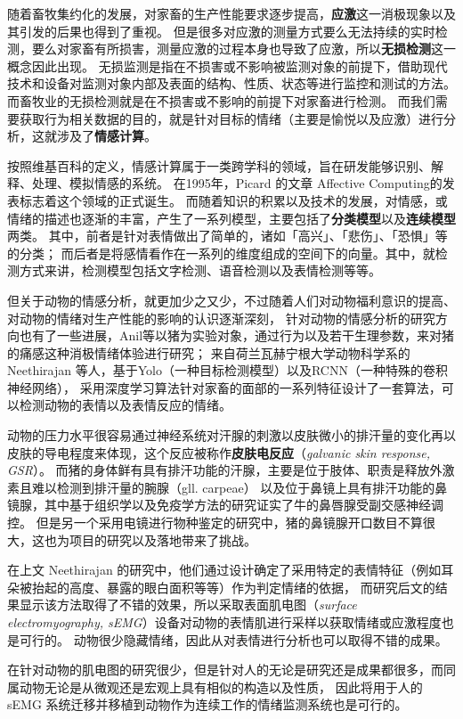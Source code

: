 \documentclass[UTF8]{ctexart}
\begin{document}
随着畜牧集约化的发展，对家畜的生产性能要求逐步提高，\textbf{应激}这一消极现象以及其引发的后果也得到了重视。
但是很多对应激的测量方式要么无法持续的实时检测，要么对家畜有所损害，测量应激的过程本身也导致了应激，所以\textbf{无损检测}这一概念因此出现。
无损监测是指在不损害或不影响被监测对象的前提下，借助现代技术和设备对监测对象内部及表面的结构、性质、状态等进行监控和测试的方法。
而畜牧业的无损检测就是在不损害或不影响的前提下对家畜进行检测。\cite{wang2017monitor}
而我们需要获取行为相关数据的目的，就是针对目标的情绪（主要是愉悦以及应激）进行分析，这就涉及了\textbf{情感计算}。
\par
按照维基百科的定义，情感计算属于一类跨学科的领域，旨在研发能够识别、解释、处理、模拟情感的系统。
在1995年，Picard 的文章 Affective Computing\cite{picard1995ac}的发表标志着这个领域的正式诞生。
而随着知识的积累以及技术的发展，对情感，或情绪的描述也逐渐的丰富，产生了一系列模型，主要包括了\textbf{分类模型}以及\textbf{连续模型}两类。
其中，前者是针对表情做出了简单的，诸如「高兴」、「悲伤」、「恐惧」等的分类；
而后者是将感情看作在一系列的维度组成的空间下的向量。其中，就检测方式来讲，检测模型包括文字检测、语音检测以及表情检测等等。
\par
但关于动物的情感分析，就更加少之又少，不过随着人们对动物福利意识的提高、对动物的情绪对生产性能的影响的认识逐渐深刻\cite{wang2017monitor}，
针对动物的情感分析的研究方向也有了一些进展，Anil等\cite{anil2006pain}以猪为实验对象，通过行为以及若干生理参数，来对猪的痛感这种消极情绪体验进行研究；
来自荷兰瓦赫宁根大学动物科学系的 Neethirajan 等人\cite{neethirajan2021happy}，基于Yolo（一种目标检测模型）以及RCNN（一种特殊的卷积神经网络），
采用深度学习算法针对家畜的面部的一系列特征设计了一套算法，可以检测动物的表情以及表情反应的情绪。
\par
动物的压力水平很容易通过神经系统对汗腺的刺激以皮肤微小的排汗量的变化再以皮肤的导电程度来体现，这个反应被称作\textbf{皮肤电反应}（\emph{galvanic skin response, GSR}）。
而猪的身体鲜有具有排汗功能的汗腺，主要是位于肢体、职责是释放外激素且难以检测到排汗量的腕腺（gll. carpeae）\cite{raghav1comparative}
以及位于鼻镜上具有排汗功能的鼻镜腺，其中基于组织学以及免疫学方法的研究证实了牛的鼻唇腺受副交感神经调控\cite{ceccarelli1986innervation}。
但是另一个采用电镜进行物种鉴定的研究中，猪的鼻镜腺开口数目不算很大\cite{madkour2022scanning}，这也为项目的研究以及落地带来了挑战。
\par
在上文 Neethirajan 的研究中，他们通过设计确定了采用特定的表情特征（例如耳朵被抬起的高度、暴露的眼白面积等等）作为判定情绪的依据，
而研究后文的结果显示该方法取得了不错的效果，所以采取表面肌电图（\emph{surface electromyography, sEMG}）设备对动物的表情肌进行采样以获取情绪或应激程度也是可行的。
动物很少隐藏情绪，因此从对表情进行分析也可以取得不错的成果。
\par
在针对动物的肌电图的研究很少，但是针对人的无论是研究还是成果都很多，而同属动物无论是从微观还是宏观上具有相似的构造以及性质，
因此将用于人的 sEMG 系统迁移并移植到动物作为连续工作的情绪监测系统也是可行的。
\end{document}
